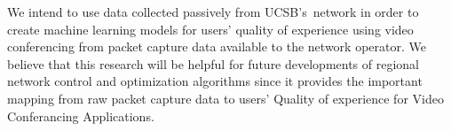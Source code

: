     We intend to use data collected passively from UCSB's~network in order to create machine learning models for users' quality of experience using video conferencing from packet capture data available to the network operator. We believe that this research will be helpful for future developments of regional network control and optimization algorithms since it provides the important mapping from raw packet capture data to users' Quality of experience for Video Conferancing Applications. 
